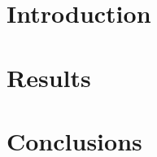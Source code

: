 \documentclass[11pt]{EuclidVIS}
\numberwithin{table}{section}
\numberwithin{figure}{section}
\begin{document}
\newpage


\section{Introduction}

\section{Results}

\section{Conclusions}
\end{document}
